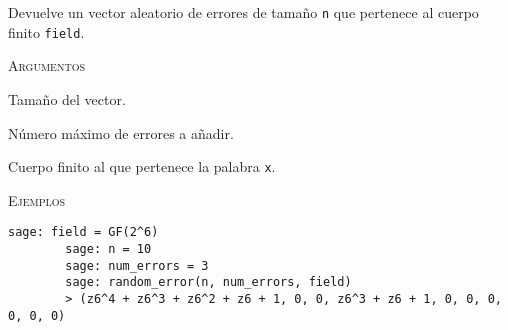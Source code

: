 \begin{description}[leftmargin=1em, font=\normalfont\ttfamily, style=nextline]
    Devuelve un vector aleatorio de errores de tamaño \texttt{n} que pertenece al cuerpo finito \texttt{field}.
  
    \textsc{Argumentos}
    \begin{description}[font=\normalfont\ttfamily]
        \item[n] Tamaño del vector.
        \item[num\_errors] Número máximo de errores a añadir.
        \item[field] Cuerpo finito al que pertenece la palabra \texttt{x}.
    \end{description}

    \textsc{Ejemplos}
    \begin{lstlisting}[gobble=4]
        sage: field = GF(2^6)
        sage: n = 10
        sage: num_errors = 3
        sage: random_error(n, num_errors, field)
        > (z6^4 + z6^3 + z6^2 + z6 + 1, 0, 0, z6^3 + z6 + 1, 0, 0, 0, 0, 0, 0)
    \end{lstlisting}
\end{description}